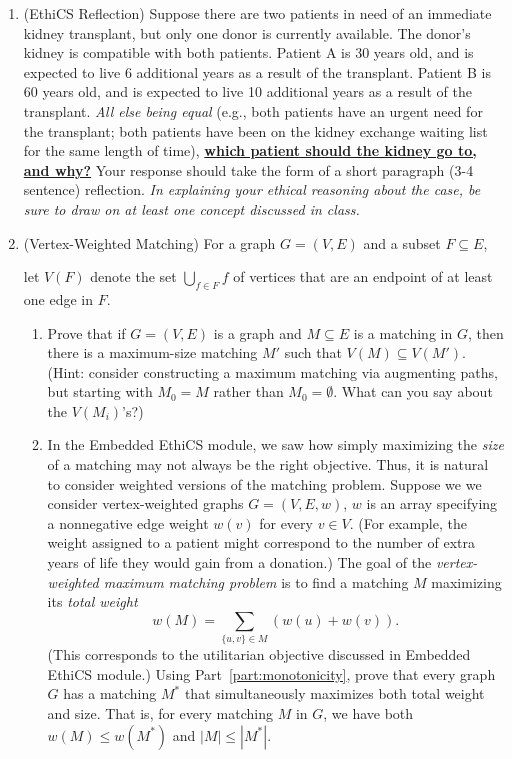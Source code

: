\documentclass[11pt]{article}
\begin{document}
\begin{enumerate}
\begin{enumerate}
    
    \end{enumerate}

 \item (EthiCS Reflection) 
 Suppose there are two patients in need of an immediate kidney transplant, but only one donor is currently available. The donor’s kidney is compatible with both patients. Patient A is 30 years old, and is expected to live 6 additional years as a result of the transplant. Patient B is 60 years old, and is expected to live 10 additional years as a result of the transplant. {\em All else being equal} (e.g., both patients have an urgent need for the transplant; both patients have been on the kidney exchange waiting list for the same length of time), \underline{\textbf{which patient should the kidney go to, and why?}} Your response should take the form of a short paragraph (3-4 sentence) reflection. {\em In explaining your ethical reasoning about the case, be sure to draw on at least one concept discussed in class.}

 \item (Vertex-Weighted Matching)
        For a graph $G=(V,E)$ and a subset $F\subseteq E$, 

        let $V(F)$ denote the set $\bigcup_{f \in F}f$ of 
        vertices that are an endpoint of at least one edge in $F$.
        \begin{enumerate}
        \item Prove that if $G=(V,E)$ is a graph and $M\subseteq E$ is a matching in $G$, then there is a maximum-size matching $M'$ such that $V(M)\subseteq V(M')$.  (Hint: consider constructing a maximum matching via augmenting paths, but starting with $M_0=M$ rather than $M_0=\emptyset$. What can you say about the $V(M_i)$'s?) \label{part:monotonicity}

        \item   In the Embedded EthiCS module, we saw how simply maximizing the {\em size} of a matching may not always be the right objective.  Thus, it is natural to consider weighted versions of the matching problem. Suppose we
        we consider vertex-weighted graphs $G = (V,E,w)$, $w$ is an array specifying a nonnegative edge weight $w(v)$ for every $v\in V$.  (For example, the weight assigned to a patient might correspond to the number of extra years of life they would gain from a donation.)
          The goal of the {\em vertex-weighted maximum matching problem} is to find a matching $M$ maximizing its {\em total weight} $$w(M) = \sum_{\{u,v\}\in M} (w(u)+w(v)).$$
        (This corresponds to the utilitarian objective discussed in Embedded EthiCS module.)
        Using Part~\ref{part:monotonicity}, prove that every graph $G$ has a matching $M^*$ that simultaneously maximizes both total weight and size.  That is, for every matching $M$ in $G$, we have
        both $w(M)\leq w(M^*)$ and $|M|\leq |M^*|$.


\end{enumerate}
\end{enumerate}
\end{document}
